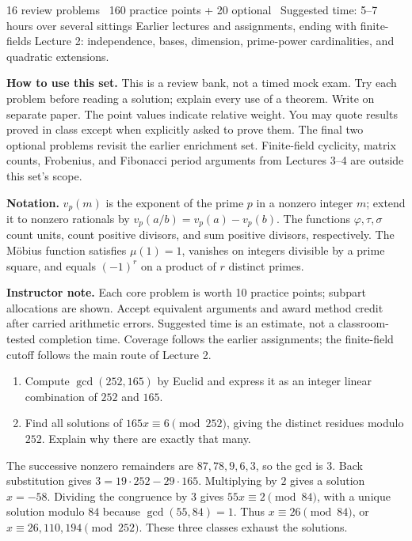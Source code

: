 
\newcommand{\Q}{\mathbb Q}
\newcommand{\setname}{Midterm review problem set}
\newcommand{\per}[1]{\overline{#1}}
\DeclareMathOperator{\ord}{ord}

{16 review problems \textbar\ 160 practice points + 20 optional
\textbar\ Suggested time: 5--7 hours over several sittings}
{Earlier lectures and assignments, ending with finite-fields Lecture 2:
independence, bases, dimension, prime-power cardinalities, and quadratic extensions.}

\textbf{How to use this set.} This is a review bank, not a timed mock exam.
Try each problem before reading a solution; explain every use of a theorem.
Write on separate paper. The point values indicate relative weight.
You may quote results proved in class except when explicitly asked to prove
them. The final two optional problems revisit the earlier enrichment set.
Finite-field cyclicity, matrix counts, Frobenius, and Fibonacci period
arguments from Lectures 3--4 are outside this set's scope.

\textbf{Notation.} $v_p(m)$ is the exponent of the prime $p$ in a nonzero
integer $m$; extend it to nonzero rationals by
$v_p(a/b)=v_p(a)-v_p(b)$. The functions $\varphi,\tau,\sigma$ count units,
count positive divisors, and sum positive divisors, respectively.
The M\"obius function satisfies $\mu(1)=1$, vanishes on integers divisible
by a prime square, and equals $(-1)^r$ on a product of $r$ distinct primes.

\ifsolutions
\textbf{Instructor note.} Each core problem is worth 10 practice points;
subpart allocations are shown. Accept equivalent arguments and award method
credit after carried arithmetic errors. Suggested time is an estimate, not
a classroom-tested completion time. Coverage follows the earlier assignments;
the finite-field cutoff follows the main route of Lecture 2.
\fi

\begin{enumerate}
\item Compute $\gcd(252,165)$ by Euclid and express it as an integer
linear combination of $252$ and $165$. 
\item Find all solutions of $165x\equiv6\pmod{252}$, giving the distinct
residues modulo $252$. Explain why there are exactly that many. 
\end{enumerate}
\begin{solution}
The successive nonzero remainders are $87,78,9,6,3$, so the gcd is $3$.
Back substitution gives $3=19\cdot252-29\cdot165$.
Multiplying by $2$ gives a solution $x=-58$. Dividing the congruence
by $3$ gives $55x\equiv2\pmod{84}$, with a unique solution modulo $84$
because $\gcd(55,84)=1$. Thus $x\equiv26\pmod{84}$, or
$x\equiv26,110,194\pmod{252}$. These three classes exhaust the solutions.
\end{solution}

